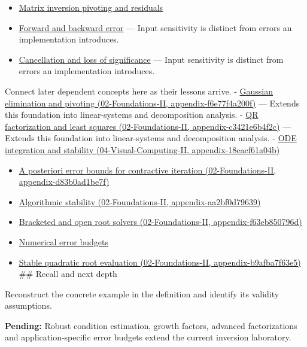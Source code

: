 \begin{itemize}
\item
  \hyperref[appendix-48d2e66378ab]{Matrix inversion pivoting and residuals}
\item
  \hyperref[appendix-a7fbaf6d1b1c]{Forward and backward error} --- Input sensitivity is distinct from errors an implementation introduces.
\item
  \hyperref[appendix-a2773a6a2f9d]{Cancellation and loss of significance} --- Input sensitivity is distinct from errors an implementation introduces.
\end{itemize}

Connect later dependent concepts here as their lessons arrive. - \href{../02-Foundations-II/main.pdf\#nameddest=appendix-f6e77f4a200f}{Gaussian elimination and pivoting (02-Foundations-II, appendix-f6e77f4a200f)} --- Extends this foundation into linear-systems and decomposition analysis. - \href{../02-Foundations-II/main.pdf\#nameddest=appendix-c3421e6b4f2c}{QR factorization and least squares (02-Foundations-II, appendix-c3421e6b4f2c)} --- Extends this foundation into linear-systems and decomposition analysis. - \href{../04-Visual-Computing-II/main.pdf\#nameddest=appendix-18eacf61a04b}{ODE integration and stability (04-Visual-Computing-II, appendix-18eacf61a04b)}

\begin{itemize}
\tightlist
\item
  \href{../02-Foundations-II/main.pdf\#nameddest=appendix-d83b0ad1be7f}{A posteriori error bounds for contractive iteration (02-Foundations-II, appendix-d83b0ad1be7f)}
\item
  \href{../02-Foundations-II/main.pdf\#nameddest=appendix-aa2bf0d79639}{Algorithmic stability (02-Foundations-II, appendix-aa2bf0d79639)}
\item
  \href{../02-Foundations-II/main.pdf\#nameddest=appendix-f63eb850796d}{Bracketed and open root solvers (02-Foundations-II, appendix-f63eb850796d)}
\item
  \hyperref[appendix-31b8c295e05f]{Numerical error budgets}
\item
  \href{../02-Foundations-II/main.pdf\#nameddest=appendix-b9afba7f63e5}{Stable quadratic root evaluation (02-Foundations-II, appendix-b9afba7f63e5)} \#\# Recall and next depth
\end{itemize}

Reconstruct the concrete example in the definition and identify its validity assumptions.

\textbf{Pending:} Robust condition estimation, growth factors, advanced factorizations and application-specific error budgets extend the current inversion laboratory.


